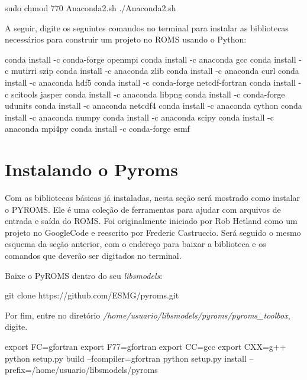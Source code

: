 \begin{bashcode}
 sudo chmod 770 Anaconda2.sh
 ./Anaconda2.sh
\end{bashcode}
\bigskip

\noindent A seguir, digite os seguintes comandos no terminal para instalar as bibliotecas necessários para construir um projeto no ROMS usando o Python:
\bigskip

\begin{bashcode}
conda install -c conda-forge openmpi
conda install -c anaconda gcc
conda install -c mutirri szip
conda install -c anaconda zlib
conda install -c anaconda curl
conda install -c anaconda hdf5
conda install -c conda-forge netcdf-fortran
conda install -c scitools jasper
conda install -c anaconda libpng
conda install -c conda-forge udunits
conda install -c anaconda netcdf4
conda install -c anaconda cython
conda install -c anaconda numpy
conda install -c anaconda scipy
conda install -c anaconda mpi4py
conda install -c conda-forge esmf
\end{bashcode}
\bigskip

\section{Instalando o Pyroms}
\bigskip

\noindent Com as bibliotecas básicas já instaladas, nesta seção será mostrado como instalar o PYROMS. Ele é uma coleção de ferramentas para ajudar com arquivos de entrada e saída do ROMS. Foi originalmente iniciado por Rob Hetland como um projeto no GoogleCode e reescrito por Frederic Castruccio. Será seguido o mesmo esquema da seção anterior, com o endereço para baixar a biblioteca e os comandos que deverão ser digitados no terminal.
\bigskip

\noindent Baixe o PyROMS dentro do seu \textit{libsmodels}:
\bigskip

\begin{bashcode}
git clone https://github.com/ESMG/pyroms.git
\end{bashcode}
\bigskip

\noindent Por fim, entre no diretório \textit{/home/usuario/libsmodels/pyroms/pyroms\_toolbox}, digite.
\bigskip

\begin{bashcode}
export FC=gfortran
export F77=gfortran
export CC=gcc
export CXX=g++
python setup.py build --fcompiler=gfortran
python setup.py install --prefix=/home/usuario/libsmodels/pyroms
\end{bashcode}
\bigskip

